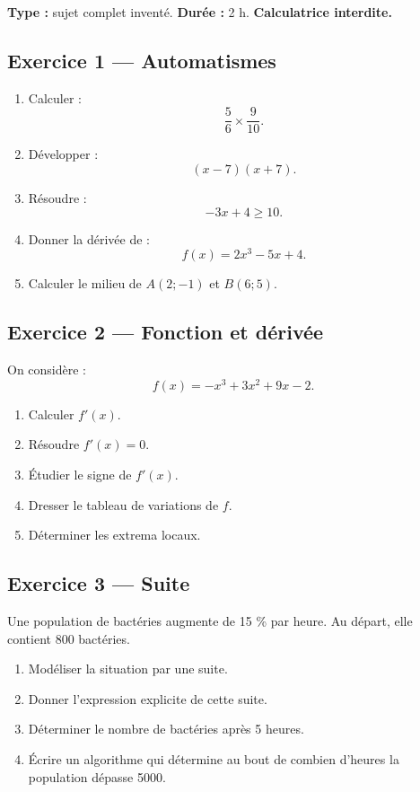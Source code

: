 \documentclass[11pt,a4paper]{article}
\begin{document}
\hypertarget{P-SUJET-13}{}
\begin{sujettype}
\textbf{Type :} sujet complet inventé.  
\textbf{Durée :} 2 h.  
\textbf{Calculatrice interdite.}

\subsection*{Exercice 1 — Automatismes}

\begin{enumerate}
  \item Calculer :
  \[
  \frac{5}{6}\times \frac{9}{10}.
  \]
  \item Développer :
  \[
  (x-7)(x+7).
  \]
  \item Résoudre :
  \[
  -3x+4\geq 10.
  \]
  \item Donner la dérivée de :
  \[
  f(x)=2x^3-5x+4.
  \]
  \item Calculer le milieu de $A(2;-1)$ et $B(6;5)$.
\end{enumerate}

\subsection*{Exercice 2 — Fonction et dérivée}

On considère :
\[
f(x)=-x^3+3x^2+9x-2.
\]

\begin{enumerate}
  \item Calculer $f'(x)$.
  \item Résoudre $f'(x)=0$.
  \item Étudier le signe de $f'(x)$.
  \item Dresser le tableau de variations de $f$.
  \item Déterminer les extrema locaux.
\end{enumerate}

\subsection*{Exercice 3 — Suite}

Une population de bactéries augmente de 15 \% par heure.  
Au départ, elle contient 800 bactéries.

\begin{enumerate}
  \item Modéliser la situation par une suite.
  \item Donner l'expression explicite de cette suite.
  \item Déterminer le nombre de bactéries après 5 heures.
  \item Écrire un algorithme qui détermine au bout de combien d'heures la population dépasse 5000.
\end{enumerate}


\end{sujettype}
\end{document}
